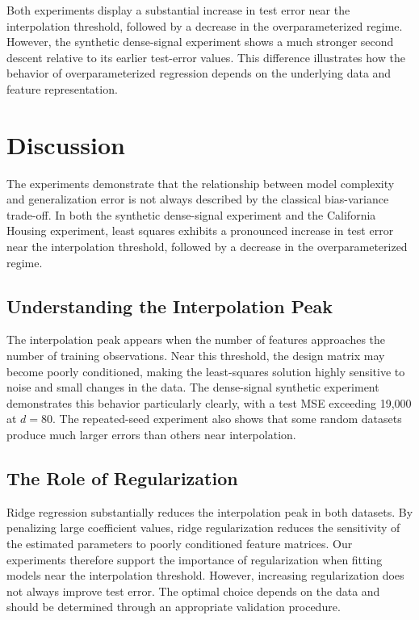 \documentclass[11pt,a4paper]{article}
\begin{document}
Both experiments display a substantial increase
in test error near the interpolation threshold,
followed by a decrease in the overparameterized
regime.
However, the synthetic dense-signal experiment
shows a much stronger second descent relative
to its earlier test-error values.
This difference illustrates how the behavior
of overparameterized regression depends on
the underlying data and feature representation.

\section{Discussion}
The experiments demonstrate that the relationship
between model complexity and generalization error
is not always described by the classical
bias-variance trade-off.
In both the synthetic dense-signal experiment
and the California Housing experiment,
least squares exhibits a pronounced increase
in test error near the interpolation threshold,
followed by a decrease in the overparameterized
regime.

\subsection{Understanding the Interpolation Peak}
The interpolation peak appears when the
number of features approaches the number
of training observations.
Near this threshold, the design matrix may
become poorly conditioned, making the
least-squares solution highly sensitive
to noise and small changes in the data.
The dense-signal synthetic experiment
demonstrates this behavior particularly
clearly, with a test MSE exceeding 19,000
at $d=80$.
The repeated-seed experiment also shows
that some random datasets produce much
larger errors than others near interpolation.

\subsection{The Role of Regularization}
Ridge regression substantially reduces
the interpolation peak in both datasets.
By penalizing large coefficient values,
ridge regularization reduces the sensitivity
of the estimated parameters to poorly
conditioned feature matrices.
Our experiments therefore support the
importance of regularization when fitting
models near the interpolation threshold.
However, increasing regularization does
not always improve test error. The optimal
choice depends on the data and should be
determined through an appropriate
validation procedure.
\end{document}
